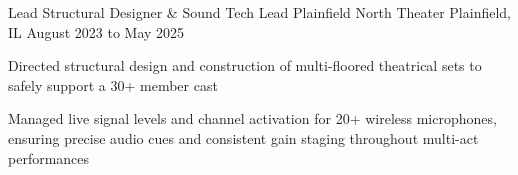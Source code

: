 {\begin{cventries}
  \cventry
    {Lead Structural Designer \& Sound Tech Lead}
    {Plainfield North Theater}
    {Plainfield, IL}
    {August 2023 to May 2025}
    {
      \begin{cvitems}
        \item {Directed structural design and construction of multi-floored theatrical sets to safely support a 30+ member cast}
        \item {Managed live signal levels and channel activation for 20+ wireless microphones, ensuring precise audio cues and consistent gain staging throughout multi-act performances}
      \end{cvitems}
    }
\end{cventries}
}
